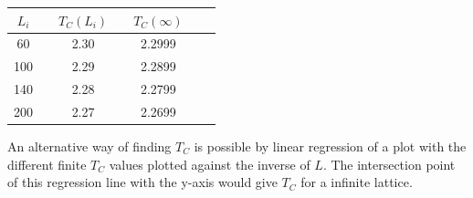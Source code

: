 \begin{center}
\label{tab:t-c}
\begin{tabularx}{\textwidth}{|c| X c| X c| X |c| }
    \hline 
        $L_i$ && $T_C(L_i)$ && $T_C(\infty)$ \\ 
    \hline
        60      &&  2.30  && 2.2999\\
        100     &&  2.29  && 2.2899\\
        140     &&  2.28  && 2.2799\\
        200     &&  2.27  && 2.2699\\
    \hline
\end{tabularx}
\end{center}

An alternative way of finding $T_C$ is possible by linear regression of a plot with the different finite $T_C$ values plotted against the inverse of $L$. The intersection point of this regression line with the y-axis would give $T_C$ for a infinite lattice.

